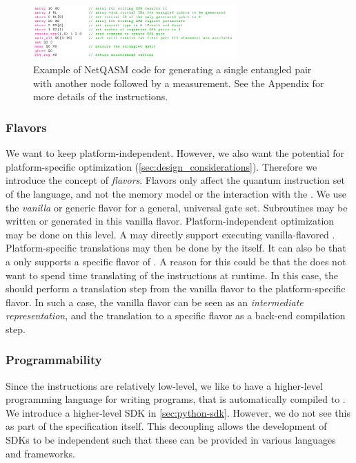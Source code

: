 \begin{figure}
      \centering
      \includegraphics[width=0.7\textwidth]{figures/netqasm/nqasm_code_example}
      \caption{Example of NetQASM code for generating a single entangled pair with another node followed by a measurement.
            See the Appendix for more details of the instructions.}
      \label{fig:nqasm_code_example}
\end{figure}

\subsubsection{Flavors}
\label{sec:design_decisions_flavours}
We want to keep \netqasm platform-independent.
However, we also want the potential for platform-specific optimization (\cref{sec:design_considerations}).
Therefore we introduce the concept of \textit{flavors}.
Flavors only affect the quantum instruction set of the language, and not the memory model or the interaction with the \QNPU.
We use the \textit{vanilla} or generic flavor for a general, universal gate set.
Subroutines may be written or generated in this vanilla flavor.
Platform-independent optimization may be done on this level.
A \QNPU may directly support executing vanilla-flavored \netqasm.
Platform-specific translations may then be done by the \QNPU itself.
It can also be that a \QNPU only supports a specific flavor of \netqasm.
A reason for this could be that the \QNPU does not want to spend time translating of the instructions at runtime.
In this case, the \host should perform a translation step from the vanilla flavor to the platform-specific flavor.
In such a case, the vanilla flavor can be seen as an \textit{intermediate representation}, and the translation to a specific flavor as a back-end compilation step.

\subsubsection{Programmability}
Since the \netqasm instructions are relatively low-level, we like to have a higher-level programming language for writing programs, that is automatically compiled to \netqasm.
We introduce a higher-level SDK in \cref{sec:python-sdk}.
However, we do not see this as part of the \netqasm specification itself.
This decoupling allows the development of SDKs to be independent such that these can be provided in various languages and frameworks.

